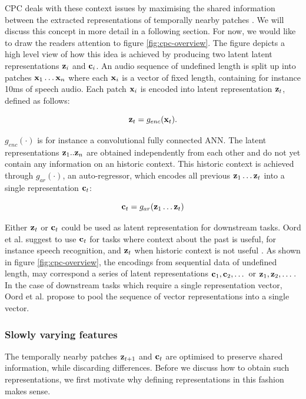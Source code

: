 	CPC deals with these context issues by maximising the shared information between the extracted representations of temporally nearby patches \cite{lowePuttingEndEndtoEnd2020}. We will discuss this concept in more detail in a following section. For now, we would like to draw the readers attention to figure \ref{fig:cpc-overview}. The figure depicts a high level view of how this idea is achieved by producing two latent latent representations $\mathbf{z}_i$ and $\mathbf{c}_i$. An audio sequence of undefined length is split up into patches $\mathbf{x}_1 \dots \mathbf{x}_n$ where each $\mathbf{x}_i$ is a vector of fixed length, containing for instance 10ms of speech audio. Each patch $\mathbf{x}_i$ is encoded into latent representation $\mathbf{z}_t$, defined as follows:
	
	$$
	\mathbf{z}_t = g_{enc}(\mathbf{x}_t) .
	$$
	
	$g_{enc}( \cdot )$ is for instance a convolutional fully connected ANN. The latent representations $\mathbf{z}_1..\mathbf{z}_n$ are obtained independently from each other and do not yet contain any information on an historic context. This historic context is achieved through $g_{ar}( \cdot )$, an auto-regressor, which encodes all previous $\mathbf{z}_1 \dots \mathbf{z}_t$ into a single representation $\mathbf{c}_t$:
	
	$$
	\mathbf{c}_t = g_{ar}(\mathbf{z}_1 \dots \mathbf{z}_t)
	$$
	
	Either $\mathbf{z}_t$ or $\mathbf{c}_t$ could be used as latent representation for downstream tasks. Oord et al. suggest to use $\mathbf{c}_t$ for tasks where context about the past is useful, for instance speech recognition, and $\mathbf{z}_t$ when historic context is not useful \cite{oordRepresentationLearningContrastive2019}. As shown in figure \ref{fig:cpc-overview}, the encodings from sequential data of undefined length, may correspond a series of latent representations $\mathbf{c}_1, \mathbf{c}_2, \dots $ or $\mathbf{z}_1, \mathbf{z}_2, \dots $. In the case of downstream tasks which require a single representation vector, Oord et al. propose to pool the sequence of vector representations into a single vector.
	

\subsubsection{Slowly varying features}
	The temporally nearby patches $\mathbf{z}_{t+1}$ and $\mathbf{c}_t$ are optimised to preserve shared information, while discarding differences. Before we discuss how to obtain such representations, we first motivate why defining representations in this fashion makes sense.
	
